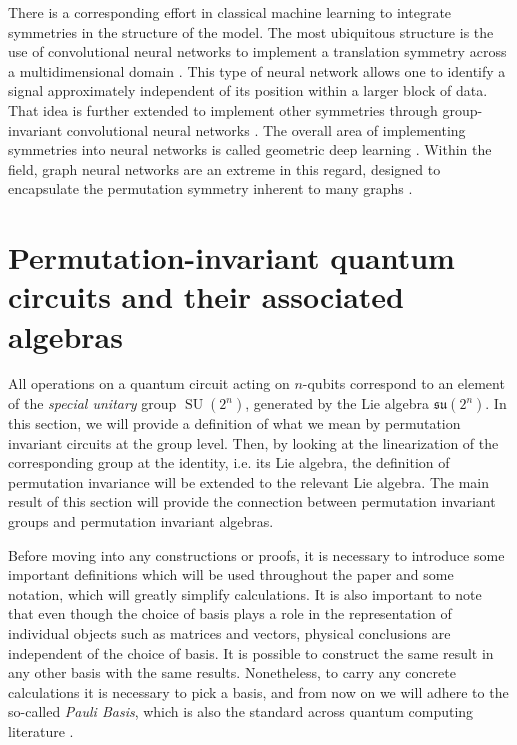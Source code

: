\documentclass[%
 reprint,
 amsmath,amssymb,
 aps,
]{revtex4-2}
\theoremstyle{definition}%
\begin{document}
There is a corresponding effort in classical machine learning to integrate symmetries in the structure of the model. The most ubiquitous structure is the use of convolutional neural networks to implement a translation symmetry across a multidimensional domain \cite{wiatowski_mathematical_2018}. This type of neural network allows one to identify a signal approximately independent of its position within a larger block of data. That idea is further extended to implement other symmetries through group-invariant convolutional neural networks \cite{bronstein_geometric_2021}. The overall area of implementing symmetries into neural networks is called geometric deep learning \cite{bronstein_geometric_2021}. Within the field, graph neural networks are an extreme in this regard, designed to encapsulate the permutation symmetry inherent to many graphs \cite{zhou_graph_2020}. 




\section{Permutation-invariant quantum circuits and their associated algebras}

All operations on a quantum circuit acting on $n$-qubits correspond to an element of the \textit{special unitary} group $\operatorname{SU}(2^n)$, generated by the Lie algebra $\mathfrak{su}(2^n)$. In this section, we will provide a definition of what we mean by permutation invariant circuits at the group level. Then, by looking at the linearization of the corresponding group at the identity, i.e. its Lie algebra, the definition of permutation invariance will be extended to the relevant Lie algebra. The main result of this section will provide the connection between permutation invariant groups and permutation invariant algebras.

Before moving into any constructions or proofs, it is necessary to introduce some important definitions which will be used throughout the paper and some notation, which will greatly simplify calculations. It is also important to note that even though the choice of basis plays a role in the representation of individual objects such as matrices and vectors, physical conclusions are independent of the choice of basis. It is possible to construct the same result in any other basis with the same results. Nonetheless, to carry any concrete calculations it is necessary to pick a basis, and from now on we will adhere to the so-called \textit{Pauli Basis}, which is also the standard across quantum computing literature \cite{nielsen_quantum_2010}.
\end{document}
